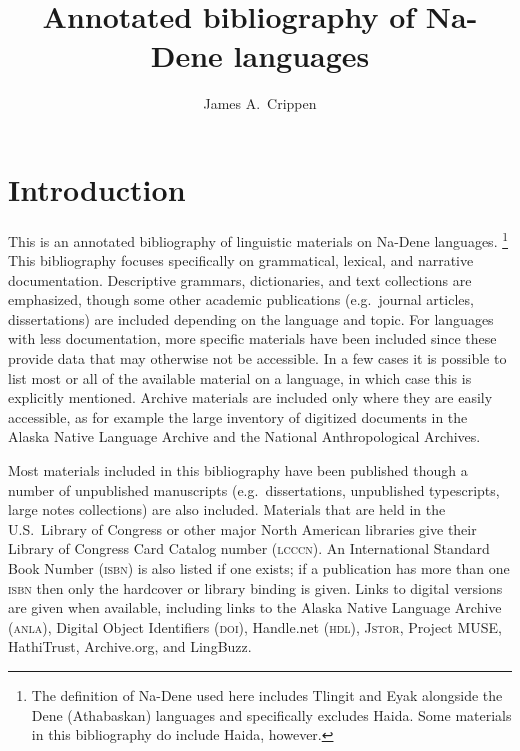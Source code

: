 \documentclass[12pt,letterpaper,oneside,article]{memoir}
\begin{document}
\title{Annotated bibliography of Na-Dene languages}
\author{James A.\ Crippen}

\maketitle

\tableofcontents

\setcounter{section}{-1}
\section{Introduction}\label{sec:intro}

This is an annotated bibliography of linguistic materials on Na-Dene languages.%
\footnote{The definition of Na-Dene used here includes Tlingit and Eyak alongside the Dene (Athabaskan) languages and specifically excludes Haida.
Some materials in this bibliography do include Haida, however.}
This bibliography focuses specifically on grammatical, lexical, and narrative documentation.
Descriptive grammars, dictionaries, and text collections are emphasized, though some other academic publications (e.g.\ journal articles, dissertations) are included depending on the language and topic.
For languages with less documentation, more specific materials have been included since these provide data that may otherwise not be accessible.
In a few cases it is possible to list most or all of the available material on a language, in which case this is explicitly mentioned.
Archive materials are included only where they are easily accessible, as for example the large inventory of digitized documents in the Alaska Native Language Archive and the National Anthropological Archives.

Most materials included in this bibliography have been published though a number of unpublished manuscripts (e.g.\ dissertations, unpublished typescripts, large notes collections) are also included.
Materials that are held in the U.S.\ Library of Congress or other major North American libraries give their Library of Congress Card Catalog number (\textsc{lcccn}).
An International Standard Book Number (\textsc{isbn}) is also listed if one exists; if a publication has more than one \textsc{isbn} then only the hardcover or library binding is given.
Links to digital versions are given when available, including links to the Alaska Native Language Archive (\textsc{anla}), Digital Object Identifiers (\textsc{doi}), Handle.net (\textsc{hdl}), \textsc{Jstor}, Project MUSE, HathiTrust, Archive.org, and LingBuzz.
\end{document}
